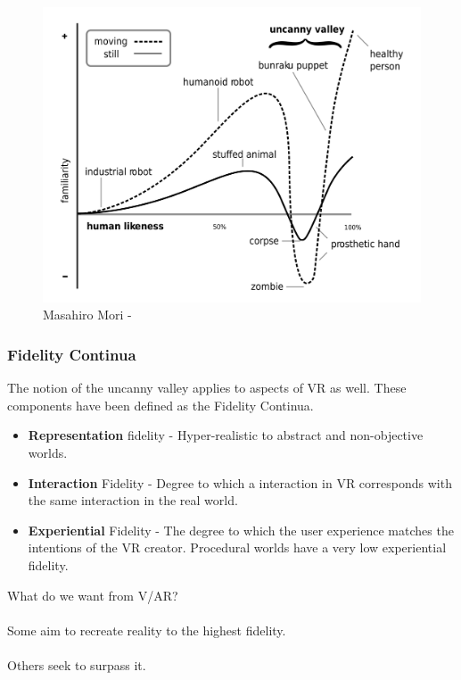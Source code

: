\begin{frame}
	\begin{figure}
		 \includegraphics[scale=.13]{assets/uncanny}  
		  \caption{Masahiro Mori - }
	\end{figure}
\end{frame}

\begin{frame}
	\frametitle{Fidelity Continua}
	The notion of the uncanny valley applies to aspects of VR as well. These components have been defined as the Fidelity Continua. 
	
	\begin{itemize}
	 	\item	\textbf{Representation} fidelity - Hyper-realistic to abstract and non-objective worlds. 
		\item	\textbf{Interaction} Fidelity - Degree to which a interaction in VR corresponds with the same interaction in the real world.
		\item \textbf{Experiential} Fidelity - The degree to which the user experience matches the intentions of the VR creator. Procedural worlds have a very low experiential fidelity.
	 \end{itemize}
		
\end{frame}

\begin{frame}
	What do we want from V/AR? \\~\\
	Some aim to recreate reality to the highest fidelity. \\~\\
	Others seek to surpass it.
\end{frame}

